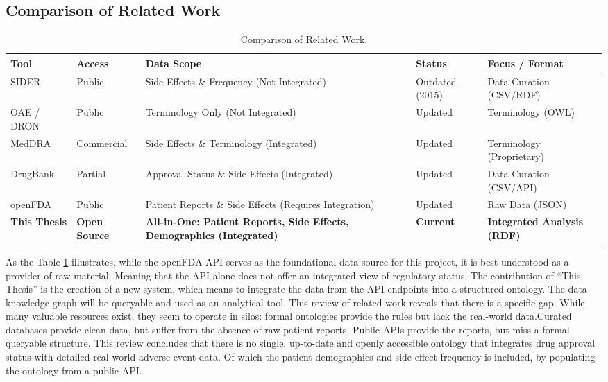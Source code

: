 \subsection{Comparison of Related Work}

\begin{table}[htbp]
\centering
\small
\begin{tabular}{|p{1.7cm}|p{2.0cm}|p{3.6cm}|p{1.7cm}|p{2.4cm}|}
\hline
\textbf{Tool} & \textbf{Access} & \textbf{Data Scope} & \textbf{Status} & \textbf{Focus / Format} \\
\hline
SIDER & Public & Side Effects \& Frequency (Not Integrated) & Outdated (2015) & Data Curation (CSV/RDF) \\
\hline
OAE / DRON & Public & Terminology Only (Not Integrated) & Updated & Terminology (OWL) \\
\hline
MedDRA & Commercial & Side Effects \& Terminology (Integrated) & Updated & Terminology (Proprietary) \\
\hline
DrugBank & Partial & Approval Status \& Side Effects (Integrated) & Updated & Data Curation (CSV/API) \\
\hline
openFDA & Public & Patient Reports \& Side Effects (Requires Integration) & Updated & Raw Data (JSON) \\
\hline
\textbf{This Thesis} & \textbf{Open Source} & \textbf{All-in-One: Patient Reports, Side Effects, Demographics (Integrated)} & \textbf{Current} & \textbf{Integrated Analysis (RDF)} \\
\hline
\end{tabular}
\caption{Comparison of Related Work.}
\label{tab:related_work_comparison}
\end{table}

As the Table \ref{tab:related_work_comparison} illustrates, while the openFDA API serves as the foundational data source for this project, it is best understood as a provider of raw material. Meaning that the API alone does not offer an integrated view of regulatory status. The contribution of “This Thesis” is the creation of a new system, which means to integrate the data from the API endpoints into a structured ontology. The data knowledge graph will be queryable and used as an analytical tool.
This review of related work reveals that there is a specific gap. While many valuable resources exist, they seem to operate in silos: formal ontologies provide the rules but lack the real-world data.Curated databases provide clean data, but suffer from the absence of raw patient reports. Public APIs provide the reports, but miss a formal queryable structure. This review concludes that there is no single, up-to-date and openly accessible ontology that integrates drug approval status with detailed real-world adverse event data. Of which the patient demographics and side effect frequency is included, by populating the ontology from a public API. 

